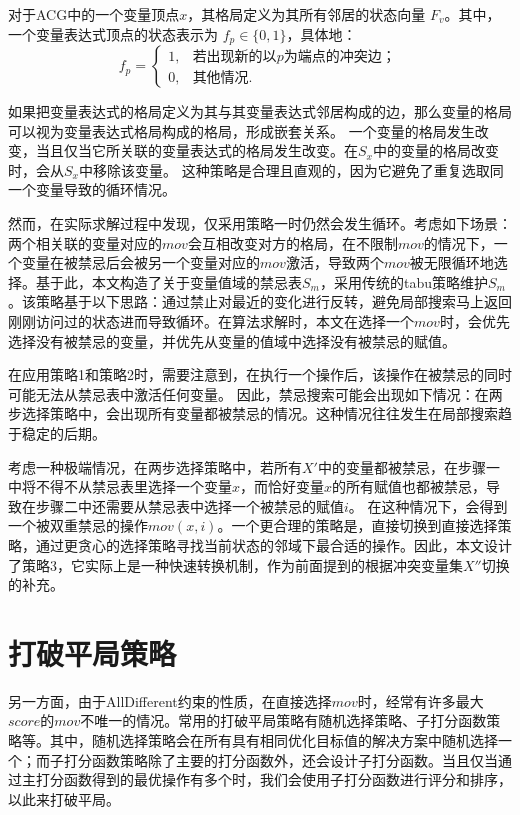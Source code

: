 \begin{definition}[格局]
对于ACG中的一个变量顶点$x$，其格局定义为其所有邻居的状态向量 $F_v$。其中，一个变量表达式顶点的状态表示为 $f_p \in \{0, 1\}$，具体地：
\[
f_p = 
\begin{cases} 
1, & \text{若出现新的以$p$为端点的冲突边；}\\
0, & \text{其他情况.}
\end{cases}
\]
\end{definition}
如果把变量表达式的格局定义为其与其变量表达式邻居构成的边，那么变量的格局可以视为变量表达式格局构成的格局，形成嵌套关系。
一个变量的格局发生改变，当且仅当它所关联的变量表达式的格局发生改变。在$S_x$中的变量的格局改变时，会从$S_x$中移除该变量。
这种策略是合理且直观的，因为它避免了重复选取同一个变量导致的循环情况。

然而，在实际求解过程中发现，仅采用策略一时仍然会发生循环。考虑如下场景：两个相关联的变量对应的$mov$会互相改变对方的格局，在不限制$mov$的情况下，一个变量在被禁忌后会被另一个变量对应的$mov$激活，导致两个$mov$被无限循环地选择。基于此，本文构造了关于变量值域的禁忌表$S_m$，采用传统的tabu策略维护$S_m$。该策略基于以下思路：通过禁止对最近的变化进行反转，避免局部搜索马上返回刚刚访问过的状态进而导致循环。在算法求解时，本文在选择一个$mov$时，会优先选择没有被禁忌的变量，并优先从变量的值域中选择没有被禁忌的赋值。

在应用策略1和策略2时，需要注意到，在执行一个操作后，该操作在被禁忌的同时可能无法从禁忌表中激活任何变量。
因此，禁忌搜索可能会出现如下情况：在两步选择策略中，会出现所有变量都被禁忌的情况。这种情况往往发生在局部搜索趋于稳定的后期。

考虑一种极端情况，在两步选择策略中，若所有$X'$中的变量都被禁忌，在步骤一中将不得不从禁忌表里选择一个变量$x$，而恰好变量$x$的所有赋值也都被禁忌，导致在步骤二中还需要从禁忌表中选择一个被禁忌的赋值$i$。
在这种情况下，会得到一个被双重禁忌的操作$mov(x,i)$。一个更合理的策略是，直接切换到直接选择策略，通过更贪心的选择策略寻找当前状态的邻域下最合适的操作。因此，本文设计了策略3，它实际上是一种快速转换机制，作为前面提到的根据冲突变量集$X''$切换的补充。

\section{打破平局策略}
另一方面，由于AllDifferent约束的性质，在直接选择$mov$时，经常有许多最大$score$的$mov$不唯一的情况。常用的打破平局策略有随机选择策略、子打分函数策略等。其中，随机选择策略会在所有具有相同优化目标值的解决方案中随机选择一个；而子打分函数策略除了主要的打分函数外，还会设计子打分函数。当且仅当通过主打分函数得到的最优操作有多个时，我们会使用子打分函数进行评分和排序，以此来打破平局。

